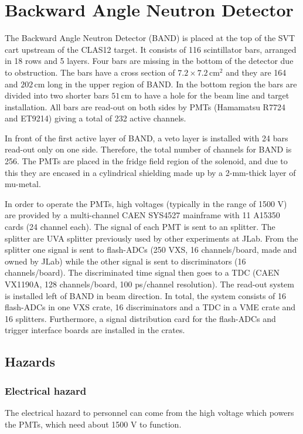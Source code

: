 \section{Backward Angle Neutron Detector}
The Backward Angle Neutron Detector (BAND) is placed at the top of the SVT cart upstream of the CLAS12 target. It consists of 116 scintillator bars, arranged in 18 rows and 5 layers. Four bars are missing in the bottom of the detector due to obstruction. The bars have a cross section of $7.2 \times 7.2\,\mathrm{cm}^{2}$ and they are 164 and $202\,\mathrm{cm}$ long in the upper region of BAND. In the bottom region the bars are divided into two shorter bars $51\,\mathrm{cm}$ to have a hole for the beam line and target installation. All bars are read-out on both sides by PMTs (Hamamatsu R7724 and ET9214) giving a total of 232 active channels. 

In front of the first active layer of BAND, a veto layer is installed with 24 bars read-out only on one side. Therefore, the total number of channels for BAND is 256.
The PMTs are placed in the fridge field region of the solenoid, and due to this they are encased in a cylindrical shielding made up by a 2-mm-thick layer of mu-metal.

In order to operate the PMTs, high voltages (typically in the range of 1500 V) are provided by a multi-channel CAEN SYS4527 mainframe with 11 A15350 cards (24 channel each).
The signal of each PMT is sent to an splitter. The splitter are UVA splitter previously used by other experiments at JLab.
From the splitter one signal is sent to flash-ADCs (250 VXS, 16 channels/board, made and owned by JLab) while the other signal is sent to  discriminators (16 channels/board).
The discriminated time signal then goes to a TDC (CAEN VX1190A, 128 channels/board, 100 ps/channel resolution). The read-out system is installed left of BAND in beam direction. 
In total, the system consists of 16 flash-ADCs in one VXS crate, 16 discriminators and a TDC in a VME crate and 16 splitters.  Furthermore, a signal distribution card for the flash-ADCs and trigger interface boards are installed in the crates.


\subsection{Hazards} 
\indent
\subsubsection{Electrical hazard}
The electrical hazard to personnel can come from the high voltage which powers the PMTs, which need about 1500 V to function. 

